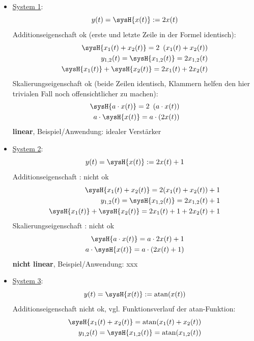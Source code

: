 \begin{Loesung}
\begin{itemize}
\item  \underline{System 1}:
\begin{equation}
y(t) = \sysH{x(t)}:=2 x(t)
\end{equation}
Additionseigenschaft ok (erste und letzte Zeile in der Formel identisch):
\begin{align}
\sysH{x_1(t)+x_2(t)}=2\,\,\,(x_1(t) + x_2(t))\\
y_{1,2}(t) = \sysH{x_{1,2}(t)}=2 x_{1,2}(t)\\
\sysH{x_1(t)} + \sysH{x_2(t)} = 2 x_1(t) + 2 x_2(t)
\end{align}
Skalierungseigenschaft ok (beide Zeilen identisch, Klammern helfen den hier trivialen
Fall noch offensichtlicher zu machen):
\begin{align}
\sysH{a \cdot x(t)}= 2\,\,\,( a \cdot x(t))\\
a \cdot \sysH{x(t)}=  a \cdot (2 x(t))
\end{align}
\textbf{linear}, Beispiel/Anwendung: idealer Verstärker
\item  \underline{System 2}:
\begin{equation}
y(t) = \sysH{x(t)}:= 2 x(t) + 1
\end{equation}
Additionseigenschaft : nicht ok
\begin{align}
\sysH{x_1(t)+x_2(t)}= 2(x_1(t)+x_2(t)) + 1\\
y_{1,2}(t) = \sysH{x_{1,2}(t)}= 2 x_{1,2}(t) + 1\\
\sysH{x_1(t)} + \sysH{x_2(t)} = 2 x_{1}(t) + 1 + 2 x_{2}(t) + 1
\end{align}
Skalierungseigenschaft : nicht ok
\begin{align}
\sysH{a \cdot x(t)}= a \cdot 2 x(t) + 1\\
a \cdot \sysH{x(t)}= a \cdot (2 x(t) + 1)
\end{align}
\textbf{nicht linear}, Beispiel/Anwendung: xxx
\item  \underline{System 3}:
\begin{equation}
y(t) = \sysH{x(t)}:= \mathrm{atan}(x(t))
\end{equation}
Additionseigenschaft nicht ok, vgl. Funktionsverlauf der atan-Funktion:
\begin{align}
\sysH{x_1(t)+x_2(t)}=\mathrm{atan}(x_1(t)+x_2(t))\\
y_{1,2}(t) = \sysH{x_{1,2}(t)}= \mathrm{atan}(x_{1,2}(t))\\

\end{align}
\end{itemize}
\end{Loesung}
